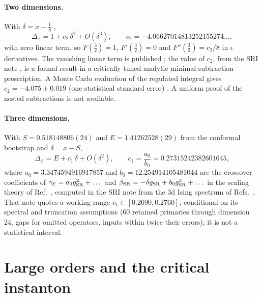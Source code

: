 \documentclass[11pt,a4paper]{article}
\numberwithin{equation}{section}
\newcommand{\De}{\Delta_{\mathcal E}}   %
\begin{document}
\paragraph{Two dimensions.} With $\delta=x-\frac18$ \cite{Behan:2017emf,noteSRI},
\begin{equation}
 \De=1+c_2\,\delta^2+O(\delta^3),\qquad c_2=-4.06627014813252155274\ldots,
 \label{eq:sr2}
\end{equation}
with zero linear term, so $F(\frac32)=1$, $F'(\frac32)=0$ and $F''(\frac32)=c_2/8$ in
$\epsilon$ derivatives. The vanishing linear term is published \cite{Behan:2017emf}; the
value of $c_2$, from the SRI note \cite{noteSRI}, is a formal result in a critically tuned
analytic minimal-subtraction prescription. A Monte Carlo evaluation of the regulated integral
gives $c_2=-4.075\pm0.019$ (one statistical standard error) \cite{noteSRI}. A uniform proof
of the nested subtractions is not available.

\paragraph{Three dimensions.} With $S=0.518148806(24)$ and $E=1.41262528(29)$ from the
conformal bootstrap \cite{Chang:2024whx} and $\delta=x-S$,
\begin{equation}
 \De=E+c_1\,\delta+O(\delta^2),\qquad c_1=\frac{a_0}{b_0}=0.27315242382601645,
 \label{eq:sr3}
\end{equation}
where $a_0=3.3474594916917857$ and $b_0=12.254914105481044$ are the crossover
coefficients of $\gamma_{\mathcal E}=a_0g_{\rm SR}^2+\dots$ and
$\beta_{\rm SR}=-\delta g_{\rm SR}+b_0g_{\rm SR}^3+\dots$ in the scaling theory of
Ref.~\cite{Behan:2017emf}, computed in the SRI note \cite{noteSRI} from the 3d Ising
spectrum of Refs.~\cite{Simmons-Duffin:2016wlq,Chang:2024whx}. That note quotes a working
range $c_1\in[0.2690,0.2760]$, conditional on its spectral and truncation assumptions (60
retained primaries through dimension 24, gaps for omitted operators, inputs within twice
their errors); it is not a statistical interval.

\section{Large orders and the critical instanton}\label{sec:largeorder}
\end{document}
